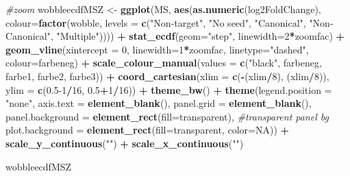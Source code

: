 \documentclass[
]{article}
\newenvironment{Shaded}{\begin{snugshade}}{\end{snugshade}}
\newcommand{\AttributeTok}[1]{\textcolor[rgb]{0.13,0.29,0.53}{#1}}
\newcommand{\CommentTok}[1]{\textcolor[rgb]{0.56,0.35,0.01}{\textit{#1}}}
\newcommand{\ConstantTok}[1]{\textcolor[rgb]{0.56,0.35,0.01}{#1}}
\newcommand{\DecValTok}[1]{\textcolor[rgb]{0.00,0.00,0.81}{#1}}
\newcommand{\FloatTok}[1]{\textcolor[rgb]{0.00,0.00,0.81}{#1}}
\newcommand{\FunctionTok}[1]{\textcolor[rgb]{0.13,0.29,0.53}{\textbf{#1}}}
\newcommand{\NormalTok}[1]{#1}
\newcommand{\OtherTok}[1]{\textcolor[rgb]{0.56,0.35,0.01}{#1}}
\newcommand{\SpecialCharTok}[1]{\textcolor[rgb]{0.81,0.36,0.00}{\textbf{#1}}}
\newcommand{\StringTok}[1]{\textcolor[rgb]{0.31,0.60,0.02}{#1}}
\begin{document}
\begin{Shaded}
\begin{Highlighting}[]
\CommentTok{\#zoom}
\NormalTok{wobbleecdfMSZ }\OtherTok{\textless{}{-}} \FunctionTok{ggplot}\NormalTok{(MS, }\FunctionTok{aes}\NormalTok{(}\FunctionTok{as.numeric}\NormalTok{(log2FoldChange), }\AttributeTok{colour=}\FunctionTok{factor}\NormalTok{(wobble, }\AttributeTok{levels =} \FunctionTok{c}\NormalTok{(}\StringTok{"Non{-}target"}\NormalTok{, }\StringTok{"No seed"}\NormalTok{, }\StringTok{"Canonical"}\NormalTok{, }\StringTok{"Non{-}Canonical"}\NormalTok{, }\StringTok{"Multiple"}\NormalTok{)))) }\SpecialCharTok{+} 
  \FunctionTok{stat\_ecdf}\NormalTok{(}\AttributeTok{geom=}\StringTok{"step"}\NormalTok{, }\AttributeTok{linewidth=}\DecValTok{2}\SpecialCharTok{*}\NormalTok{zoomfac) }\SpecialCharTok{+}
  \FunctionTok{geom\_vline}\NormalTok{(}\AttributeTok{xintercept =} \DecValTok{0}\NormalTok{, }\AttributeTok{linewidth=}\DecValTok{1}\SpecialCharTok{*}\NormalTok{zoomfac, }\AttributeTok{linetype=}\StringTok{"dashed"}\NormalTok{, }\AttributeTok{colour=}\NormalTok{farbeneg) }\SpecialCharTok{+}
  \FunctionTok{scale\_colour\_manual}\NormalTok{(}\AttributeTok{values =} \FunctionTok{c}\NormalTok{(}\StringTok{"black"}\NormalTok{, farbeneg, farbe1, farbe2, farbe3)) }\SpecialCharTok{+}
  \FunctionTok{coord\_cartesian}\NormalTok{(}\AttributeTok{xlim =} \FunctionTok{c}\NormalTok{(}\SpecialCharTok{{-}}\NormalTok{(xlim}\SpecialCharTok{/}\DecValTok{8}\NormalTok{), (xlim}\SpecialCharTok{/}\DecValTok{8}\NormalTok{)), }\AttributeTok{ylim =} \FunctionTok{c}\NormalTok{(}\FloatTok{0.5}\DecValTok{{-}1}\SpecialCharTok{/}\DecValTok{16}\NormalTok{, }\FloatTok{0.5}\SpecialCharTok{+}\DecValTok{1}\SpecialCharTok{/}\DecValTok{16}\NormalTok{)) }\SpecialCharTok{+} 
  \FunctionTok{theme\_bw}\NormalTok{() }\SpecialCharTok{+}
  \FunctionTok{theme}\NormalTok{(}\AttributeTok{legend.position =} \StringTok{"none"}\NormalTok{, }\AttributeTok{axis.text =} \FunctionTok{element\_blank}\NormalTok{(), }\AttributeTok{panel.grid =} \FunctionTok{element\_blank}\NormalTok{(),}
        \AttributeTok{panel.background =} \FunctionTok{element\_rect}\NormalTok{(}\AttributeTok{fill=}\StringTok{\textquotesingle{}transparent\textquotesingle{}}\NormalTok{), }\CommentTok{\#transparent panel bg}
        \AttributeTok{plot.background =} \FunctionTok{element\_rect}\NormalTok{(}\AttributeTok{fill=}\StringTok{\textquotesingle{}transparent\textquotesingle{}}\NormalTok{, }\AttributeTok{color=}\ConstantTok{NA}\NormalTok{)) }\SpecialCharTok{+}
  \FunctionTok{scale\_y\_continuous}\NormalTok{(}\StringTok{""}\NormalTok{) }\SpecialCharTok{+} \FunctionTok{scale\_x\_continuous}\NormalTok{(}\StringTok{""}\NormalTok{)}


\NormalTok{wobbleecdfMSZ}
\end{Highlighting}
\end{Shaded}
\end{document}
